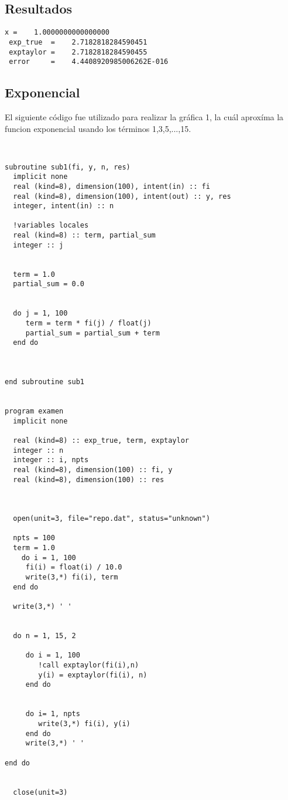\documentclass{article}
\begin{document}
\subsection{Resultados}
\begin{verbatim}
x =    1.0000000000000000     
 exp_true  =    2.7182818284590451     
 exptaylor =    2.7182818284590455     
 error     =    4.4408920985006262E-016
\end{verbatim}

\subsection{Exponencial}
El siguiente código fue utilizado para realizar la gráfica 1, la cuál aproxíma la funcion exponencial usando los términos {1,3,5,...,15}.
\begin{verbatim}


subroutine sub1(fi, y, n, res)
  implicit none
  real (kind=8), dimension(100), intent(in) :: fi
  real (kind=8), dimension(100), intent(out) :: y, res
  integer, intent(in) :: n

  !variables locales
  real (kind=8) :: term, partial_sum
  integer :: j
  

  term = 1.0
  partial_sum = 0.0

  
  do j = 1, 100
     term = term * fi(j) / float(j)
     partial_sum = partial_sum + term
  end do

  

end subroutine sub1


program examen
  implicit none

  real (kind=8) :: exp_true, term, exptaylor
  integer :: n
  integer :: i, npts
  real (kind=8), dimension(100) :: fi, y
  real (kind=8), dimension(100) :: res
  
 

  open(unit=3, file="repo.dat", status="unknown")

  npts = 100
  term = 1.0
    do i = 1, 100
     fi(i) = float(i) / 10.0
     write(3,*) fi(i), term
  end do
  
  write(3,*) ' '
  
 
  do n = 1, 15, 2
    
     do i = 1, 100
        !call exptaylor(fi(i),n)
        y(i) = exptaylor(fi(i), n) 
     end do
     

     do i= 1, npts
        write(3,*) fi(i), y(i)
     end do
     write(3,*) ' ' 

end do


  close(unit=3)


\end{verbatim}
\end{document}
